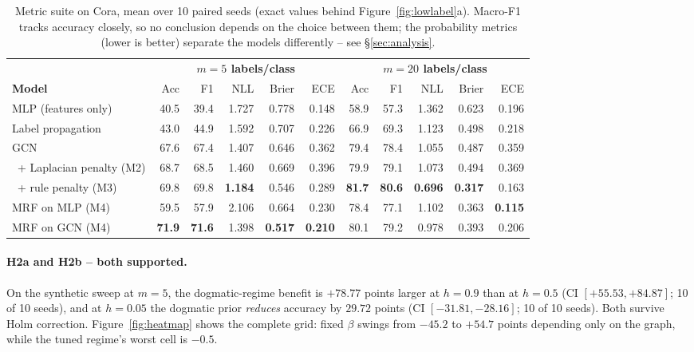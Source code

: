 \documentclass{article}
\begin{document}
\begin{table}[t]
\caption{Metric suite on Cora, mean over 10 paired seeds (exact values behind
Figure~\ref{fig:lowlabel}a). Macro-F1 tracks accuracy closely, so no conclusion depends on the
choice between them; the probability metrics (lower is better) separate the models differently
-- see \S\ref{sec:analysis}.}
\label{tab:metrics}
\begin{center}
\footnotesize
\begin{tabular}{lrrrrr@{\hskip 1.1em}rrrrr}
\toprule
& \multicolumn{5}{c}{\textbf{$m=5$ labels/class}} & \multicolumn{5}{c}{\textbf{$m=20$ labels/class}} \\
\cmidrule(lr){2-6}\cmidrule(lr){7-11}
\textbf{Model} & Acc & F1 & NLL & Brier & ECE & Acc & F1 & NLL & Brier & ECE \\
\midrule
MLP (features only)       & 40.5 & 39.4 & 1.727 & 0.778 & 0.148 & 58.9 & 57.3 & 1.362 & 0.623 & 0.196 \\
Label propagation         & 43.0 & 44.9 & 1.592 & 0.707 & 0.226 & 66.9 & 69.3 & 1.123 & 0.498 & 0.218 \\
GCN                       & 67.6 & 67.4 & 1.407 & 0.646 & 0.362 & 79.4 & 78.4 & 1.055 & 0.487 & 0.359 \\
\ + Laplacian penalty (M2) & 68.7 & 68.5 & 1.460 & 0.669 & 0.396 & 79.9 & 79.1 & 1.073 & 0.494 & 0.369 \\
\ + rule penalty (M3)      & 69.8 & 69.8 & \textbf{1.184} & 0.546 & 0.289 & \textbf{81.7} & \textbf{80.6} & \textbf{0.696} & \textbf{0.317} & 0.163 \\
MRF on MLP (M4)           & 59.5 & 57.9 & 2.106 & 0.664 & 0.230 & 78.4 & 77.1 & 1.102 & 0.363 & \textbf{0.115} \\
MRF on GCN (M4)           & \textbf{71.9} & \textbf{71.6} & 1.398 & \textbf{0.517} & \textbf{0.210} & 80.1 & 79.2 & 0.978 & 0.393 & 0.206 \\
\bottomrule
\end{tabular}
\end{center}
\end{table}

\paragraph{H2a and H2b -- both supported.} On the synthetic sweep at $m{=}5$, the
dogmatic-regime benefit is $+78.77$ points larger at $h{=}0.9$ than at $h{=}0.5$ (CI
$[+55.53,+84.87]$; 10 of 10 seeds), and at $h{=}0.05$ the dogmatic prior \emph{reduces}
accuracy by $29.72$ points (CI $[-31.81,-28.16]$; 10 of 10 seeds). Both survive Holm
correction. Figure~\ref{fig:heatmap} shows the complete grid: fixed $\beta$ swings from $-45.2$
to $+54.7$ points depending only on the graph, while the tuned regime's worst cell is $-0.5$.
\end{document}
